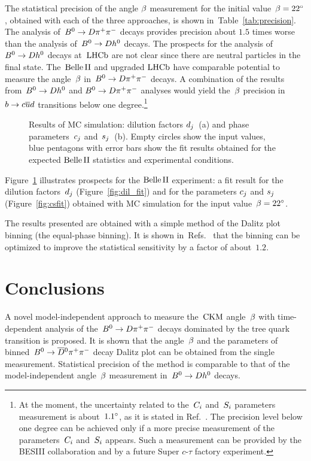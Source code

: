\documentclass[a4paper,11pt]{article}
\begin{document}
The statistical precision of the angle $\beta$ measurement for the initial 
value~$\beta=22{}^{\circ}$, obtained with each of the three approaches, 
is shown in~Table~\ref{tab:precision}.  The analysis of~$B^0\to D\pi^+\pi^-$ decays 
provides precision about $1.5$ times worse than the analysis of~$B^0\to D h^0$ 
decays.  The prospects for the analysis of $B^0\to D h^0$ decays at~$\mathrm{LHCb}$ are 
not clear since there are neutral particles in the final state. 
The~$\mathrm{Belle}\,\mathrm{II}$ and upgraded $\mathrm{LHCb}$ have comparable potential to measure 
the angle~$\beta$ in~$B^0\to D\pi^+\pi^-$ decays.  A combination of the results from~$B^0\to D h^0$ 
and $B^0\to D\pi^+\pi^-$ analyses would yield the~$\beta$ precision in $b\to c\overline{u}d$ 
transitions below one degree.\footnote{At the moment, the  
uncertainty related to the~$C_i$ and~$S_i$ parameters measurement 
is about~$1.1{}^{\circ}$, as it is stated in Ref.~\cite{cosbeta_belle}.  
The precision level below one degree can be achieved only if a more 
precise measurement of the parameters~$C_i$ and~$S_i$ appears.  
Such a measurement can be provided by the BESIII collaboration and by a future 
Super $c$-$\tau$ factory experiment.
}

\begin{figure}
 \centering
  \hspace{0.5 cm}
\caption{Results of MC simulation: dilution factors $d_j$~(a) and phase 
parameters~$c_j$ and~$s_j$~(b).  Empty circles show the input values, blue 
pentagons with error bars show the fit results obtained for the expected 
$\mathrm{Belle}\,\mathrm{II}$ statistics and experimental conditions.}
\label{fig:phase_fit}
\end{figure}

Figure~\ref{fig:phase_fit} illustrates prospects for the $\mathrm{Belle}\,\mathrm{II}$ experiment:  
a fit result for the dilution factors~$d_j$ (Figure~\ref{fig:dil_fit}) 
and for the parameters $c_j$ and $s_j$ (Figure~\ref{fig:csfit}) 
obtained with MC simulation for the input value~$\beta=22{}^{\circ}$.

The results presented are obtained with a simple method of the Dalitz plot 
binning (the equal-phase binning).  It is shown in~Refs.~\cite{BP_phi3_model2, 
CLEO_phasees} that the binning can be optimized to improve the statistical 
sensitivity by a factor of about~$1.2$.

\section{Conclusions}
A novel model-independent approach to measure the~$\mathrm{CKM}$ angle~$\beta$ with 
time-dependent analysis of the~$B^0\to D\pi^+\pi^-$ decays dominated by the tree quark 
transition is proposed.  It is shown that the angle~$\beta$ and the parameters 
of binned~$B^0\to\overline{D}{}^0\pi^+\pi^-$ decay Dalitz plot can be obtained from the single 
measurement.  Statistical precision of the method is comparable to that of 
the model-independent angle~$\beta$ measurement in~$B^0\to D h^0$ decays.
\end{document}
